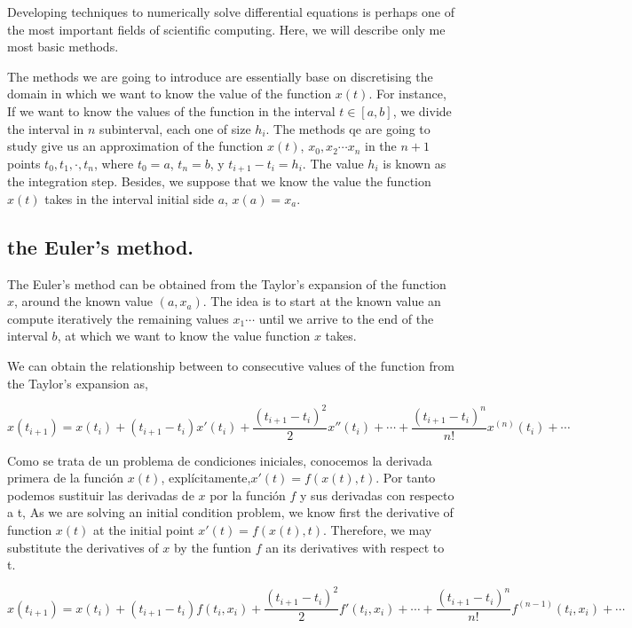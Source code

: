 \begin{paracol}{2}
Developing techniques to numerically solve differential equations is perhaps one of the most important fields of scientific computing. Here, we will describe only me most basic me\-thods.

The methods we are going to introduce are essentially base on discretising the domain in which we want to know the value of the function $x(t)$. For instance, If we want to know the values of the function in the interval $t \in [a,b]$, we divide the interval in $n$ subinterval, each one of size $h_i$. The methods qe are going to study give us an approximation of the function $x(t)$, $x_0,x_2\cdots x_n$ in the $n+1$ points $t_0,t_1,\cdot, t_n$, where $t_0=a$, $t_n=b$, y $t_{i+1}-t_i=h_i$. The value $h_i$ is known as the integration step. Besides, we suppose that we know the value the function $x(t)$ takes in the interval initial side $a$, $x(a) = x_a$.

\subsection{the Euler's method.}
The Euler's method can be obtained from the Taylor's expansion of the function $x$, around the known value $(a,x_a)$. The idea is to start at the known value an compute iteratively the remaining values $x_1\cdots$ until we arrive to the end of the interval $b$, at which we want to know the value function $x$ takes.

We can obtain the relationship between to consecutive values of the function from the Taylor's expansion as, 
\end{paracol}
\begin{equation*}
x(t_{i+1})=x(t_i)+(t_{i+1}-t_{i})x'(t_i)+\frac{(t_{i+1}-t_{i})^2}{2}x''(t_i)+\cdots+ \frac{(t_{i+1}-t_i)^n}{n!}x^{(n)}(t_i)+\cdots
\end{equation*}
\begin{paracol}{2}
Como se trata de un problema de condiciones iniciales, conocemos la derivada primera de la función $x(t)$, explícitamente,$x'(t)=f(x(t),t)$. Por tanto podemos sustituir las derivadas de $x$ por la función $f$ y sus derivadas con respecto a t,
\switchcolumn
As we are solving an initial condition problem, we know first the derivative of function $x(t)$ at the initial point $x'(t) = f(x(t),t)$. Therefore, we may substitute  the derivatives of $x$ by the funtion $f$ an its derivatives with respect to t.
\end{paracol}
\begin{equation*}
x(t_{i+1})=x(t_i)+(t_{i+1}-t_{i})f(t_i,x_i)+\frac{(t_{i+1}-t_{i})^2}{2}f'(t_i,x_i)+\cdots+ \frac{(t_{i+1}-t_i)^n}{n!}f^{(n-1)}(t_i,x_i)+\cdots
\end{equation*}
